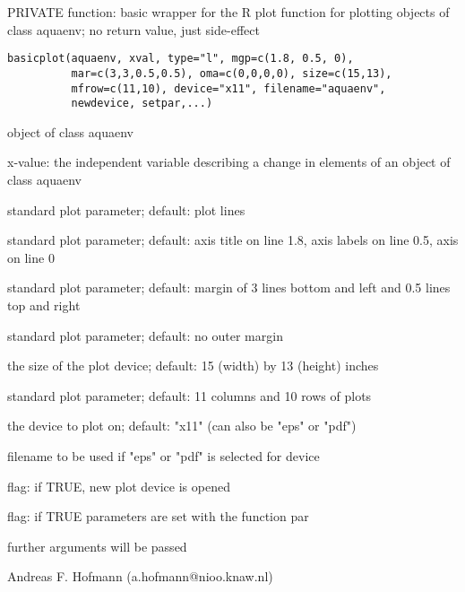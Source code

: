 \documentclass{article}
\begin{document}
\begin{Description}\relax
PRIVATE function: basic wrapper for the R plot function for plotting objects of class aquaenv; no return value, just side-effect
\end{Description}
\begin{Usage}
\begin{verbatim}basicplot(aquaenv, xval, type="l", mgp=c(1.8, 0.5, 0),
          mar=c(3,3,0.5,0.5), oma=c(0,0,0,0), size=c(15,13),
          mfrow=c(11,10), device="x11", filename="aquaenv",
          newdevice, setpar,...)\end{verbatim}
\end{Usage}
\begin{Arguments}
\begin{ldescription}
\item[\code{aquaenv }] object of class aquaenv
\item[\code{xval }] x-value: the independent variable describing a change in elements of an object of class aquaenv
\item[\code{type }] standard plot parameter;     default: plot lines
\item[\code{mgp }] standard plot parameter;     default: axis title on line 1.8, axis labels on line 0.5, axis on line 0
\item[\code{mar }] standard plot parameter;     default: margin of 3 lines bottom and left and 0.5 lines top and right
\item[\code{oma }] standard plot parameter;     default: no outer margin
\item[\code{size }] the size of the plot device; default: 15 (width) by 13 (height) inches
\item[\code{mfrow }] standard plot parameter;     default: 11 columns and 10 rows of plots
\item[\code{device }] the device to plot on;       default: "x11" (can also be "eps" or "pdf")
\item[\code{filename }] filename to be used if "eps" or "pdf" is selected for
device
\item[\code{newdevice}] flag: if TRUE, new plot device is opened
\item[\code{setpar}] flag: if TRUE parameters are set with the function par
\item[\code{... }] further arguments will be passed
\end{ldescription}
\end{Arguments}
\begin{Author}\relax
Andreas F. Hofmann (a.hofmann@nioo.knaw.nl)
\end{Author}
\end{document}
